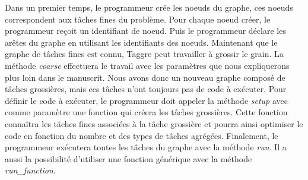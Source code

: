 
Dans un premier temps, le programmeur crée les noeuds du graphe, ces noeuds correspondent aux tâches fines du problème.
%
Pour chaque noeud créer, le programmeur reçoit un identifiant de noeud.
%
Puis le programmeur déclare les arêtes du graphe en utilisant les identifiants des noeuds.
%
Maintenant que le graphe de tâches fines est connu, Taggre peut travailler à grossir le grain.
%
La méthode {\em coarse} effectuera le travail avec les paramètres que nous expliquerons plus loin dans le manuscrit.
%
Nous avons donc un nouveau graphe composé de tâches grossières, mais ces tâches n'ont toujours pas de code à exécuter.
%
Pour définir le code à exécuter, le programmeur doit appeler la méthode {\em setup} avec comme paramètre une fonction qui créera les tâches grossières.
%
Cette fonction connaîtra les tâches fines associées à la tâche grossière et pourra ainsi optimiser le code en fonction du nombre et des types de tâches agrégées.
%
Finalement, le programmeur exécutera toutes les tâches du graphe avec la méthode {\em run}.
%
Il a aussi la possibilité d'utiliser une fonction générique avec la méthode {\em run\_function}.
